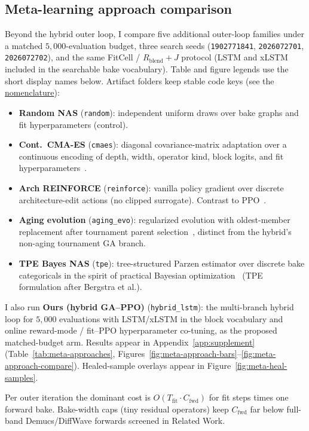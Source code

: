 \subsection{Meta-learning approach comparison}
\label{sec:meta-compare}

Beyond the hybrid outer loop, I compare five additional outer-loop families under a matched $5{,}000$-evaluation budget,
three search seeds (\texttt{1902771841}, \texttt{2026072701}, \texttt{2026072702}), and the same FitCell / $R_{\mathrm{blend}}{+}J$ protocol (LSTM and xLSTM included in the searchable bake vocabulary).
Table and figure legends use the short display names below. Artifact folders keep stable code keys (see the \href{https://github.com/reeldemo/denoise-opt}{nomenclature}):
\begin{itemize}
  \item \textbf{Random NAS} (\texttt{random}): independent uniform draws over bake graphs and fit hyperparameters (control).
  \item \textbf{Cont.\ CMA-ES} (\texttt{cmaes}): diagonal covariance-matrix adaptation over a continuous encoding of depth, width, operator kind, block logits, and fit hyperparameters~\cite{hansen2016cmaes}.
  \item \textbf{Arch REINFORCE} (\texttt{reinforce}): vanilla policy gradient over discrete architecture-edit actions (no clipped surrogate). Contrast to PPO~\cite{schulman2017,zoph2017nas}.
  \item \textbf{Aging evolution} (\texttt{aging\_evo}): regularized evolution with oldest-member replacement after tournament parent selection~\cite{real2017large,real2019}, distinct from the hybrid's non-aging tournament GA branch.
  \item \textbf{TPE Bayes NAS} (\texttt{tpe}): tree-structured Parzen estimator over discrete bake categoricals in the spirit of practical Bayesian optimization~\cite{snoek2012} (TPE formulation after Bergstra et al.).
\end{itemize}
I also run \textbf{Ours (hybrid GA--PPO)} (\texttt{hybrid\_lstm}): the multi-branch hybrid loop for $5{,}000$ evaluations with LSTM/xLSTM in the block vocabulary and online reward-mode / fit--PPO hyperparameter co-tuning, as the proposed matched-budget arm.
Results appear in Appendix~\ref{app:supplement} (Table~\ref{tab:meta-approaches}, Figures~\ref{fig:meta-approach-bars}--\ref{fig:meta-approach-compare}). Healed-sample overlays appear in Figure~\ref{fig:meta-heal-samples}.

\begin{remark}
\label{rem:complexity}
Per outer iteration the dominant cost is $O(T_{\mathrm{fit}}\cdot C_{\mathrm{fwd}})$ for fit steps times one forward bake.
Bake-width caps (tiny residual operators) keep $C_{\mathrm{fwd}}$ far below full-band Demucs/DiffWave forwards screened in Related Work.
\end{remark}

